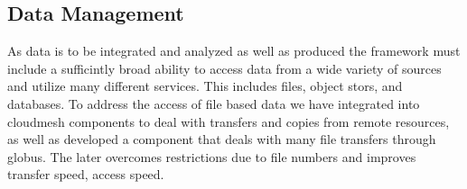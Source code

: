 \subsection{Data Management}
\label{sec:data}

As data is to be integrated and analyzed as well as produced the
framework must include a sufficintly broad ability to access data from
a wide variety of sources and utilize many different services.  This
includes files, object stors, and databases.  To address the access of
file based data we have integrated into cloudmesh components to deal
with transfers and copies from remote resources, as well as developed
a component that deals with many file transfers through globus. The
later overcomes restrictions due to file numbers and improves transfer
speed, access speed.



